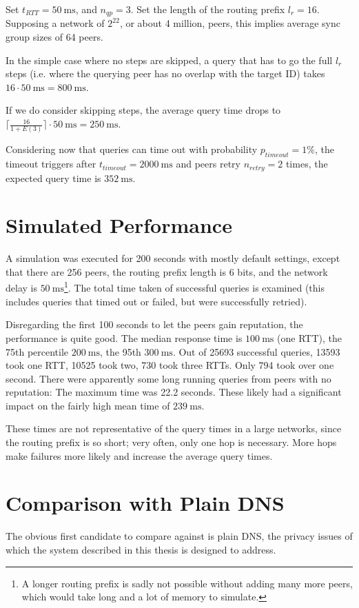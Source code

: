 Set $t_{RTT} = \SI{50}{\milli\second}$, and $n_{qp} = 3$. Set the length of the
routing prefix $l_r = 16$. Supposing a network of $2^{22}$, or about 4 million,
peers, this implies average sync group sizes of 64 peers.

In the simple case where no steps are skipped, a query that has to go the full
$l_r$ steps (i.e. where the querying peer has no overlap with the target ID)
takes $16 \cdot \SI{50}{\milli\second} = \SI{800}{\milli\second}$.

If we do consider skipping steps, the average query time drops to
$\lceil\frac{16}{1 + E(3)}\rceil \cdot \SI{50}{\milli\second} =
\SI{250}{\milli\second}$.

Considering now that queries can time out with probability $p_{timeout} = 1\%$,
the timeout triggers after $t_{timeout} = \SI{2000}{\milli\second}$ and peers
retry $n_{retry} = 2$ times, the expected query time is
$\SI{352}{\milli\second}$.

\section{Simulated Performance}
A simulation was executed for 200 seconds with mostly default settings, except
that there are 256 peers, the routing prefix length is 6 bits, and the network
delay is $\SI{50}{\milli\second}$\footnote{A longer routing prefix is sadly not
possible without adding many more peers, which would take long and a lot of
memory to simulate.}. The total time taken of successful queries is examined
(this includes queries that timed out or failed, but were successfully retried).

Disregarding the first 100 seconds to let the peers gain reputation, the
performance is quite good. The median response time is
$\SI{100}{\milli\second}$ (one RTT), the 75th percentile
$\SI{200}{\milli\second}$, the 95th $\SI{300}{\milli\second}$. Out of 25693
successful queries, 13593 took one RTT, 10525 took two, 730 took three RTTs.
Only 794 took over one second. There were apparently some long running queries
from peers with no reputation: The maximum time was 22.2 seconds. These likely
had a significant impact on the fairly high mean time of
$\SI{239}{\milli\second}$.

These times are not representative of the query times in a large networks, since
the routing prefix is so short; very often, only one hop is necessary. More hops
make failures more likely and increase the average query times.

\section{Comparison with Plain DNS}
The obvious first candidate to compare against is plain DNS, the privacy issues
of which the system described in this thesis is designed to address.

